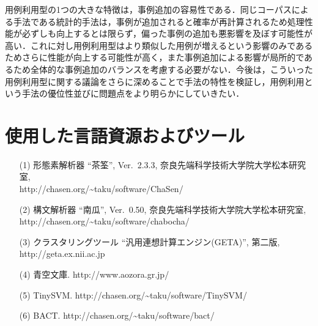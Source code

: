 \documentclass[japanese]{jnlp_1.4}
\begin{document}
用例利用型の1つの大きな特徴は，事例追加の容易性である．同じコーパスによる手法である統計的手法は，事例が追加されると確率が再計算されるため処理性能が必ずしも向上するとは限らず，偏った事例の追加も悪影響を及ぼす可能性が高い．これに対し用例利用型はより類似した用例が増えるという影響のみであるためさらに性能が向上する可能性が高く，また事例追加による影響が局所的であるため全体的な事例追加のバランスを考慮する必要がない．今後は，こういった用例利用型に関する議論をさらに深めることで手法の特性を検証し，用例利用という手法の優位性並びに問題点をより明らかにしていきたい．

\section*{使用した言語資源およびツール}

\begin{itemize}
\item[(1)]
形態素解析器 ``茶筌'', Ver.~2.3.3, 奈良先端科学技術大学院大学松本研究室, \\
http://chasen.org/{\textasciitilde}taku/software/ChaSen/

\item[(2)]
構文解析器 ``南瓜'', Ver.~0.50, 奈良先端科学技術大学院大学松本研究室, \\
http://chasen.org/{\textasciitilde}taku/software/chabocha/

\item[(3)]
クラスタリングツール ``汎用連想計算エンジン(GETA)'', 第二版, 
http://geta.ex.nii.ac.jp

\item[(4)]
青空文庫. http://www.aozora.gr.jp/

\item[(5)]
TinySVM. http://chasen.org/{\textasciitilde}taku/software/TinySVM/

\item[(6)]
BACT. http://chasen.org/{\textasciitilde}taku/software/bact/
\end{itemize}
\end{document}

